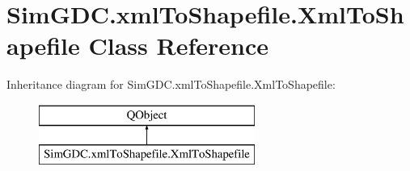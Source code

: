 \hypertarget{class_sim_g_d_c_1_1xml_to_shapefile_1_1_xml_to_shapefile}{}\section{Sim\+G\+D\+C.\+xml\+To\+Shapefile.\+Xml\+To\+Shapefile Class Reference}
\label{class_sim_g_d_c_1_1xml_to_shapefile_1_1_xml_to_shapefile}
Inheritance diagram for Sim\+G\+D\+C.\+xml\+To\+Shapefile.\+Xml\+To\+Shapefile\+:\begin{figure}[H]
\begin{center}
\leavevmode
\includegraphics[height=2.000000cm]{class_sim_g_d_c_1_1xml_to_shapefile_1_1_xml_to_shapefile}
\end{center}
\end{figure}
